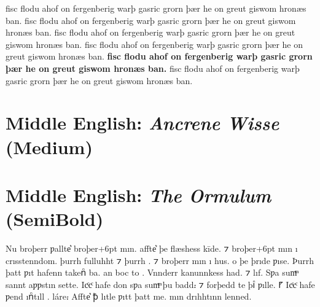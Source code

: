 \documentclass[12pt,letterpaper,openany]{book}
\begin{document}
{\extralight{} fisc flodu ahof on fergenberig warþ gasric grorn þær he on greut giswom hronæs ban.
\light{} fisc flodu ahof on fergenberig warþ gasric grorn þær he on greut giswom hronæs ban.
\medium{} fisc flodu ahof on fergenberig warþ gasric grorn þær he on greut giswom hronæs ban.
\semibold{} fisc flodu ahof on fergenberig warþ gasric grorn þær he on greut giswom hronæs ban.
\textbf{fisc flodu ahof on fergenberig warþ gasric grorn þær he on greut giswom hronæs ban.}
\extrabold{} fisc flodu ahof on fergenberig warþ gasric grorn þær he on greut giswom hronæs ban.}

\section{Middle English: \textit{Ancrene Wisse} (Medium)}

{\large\medium{}}

\section{Middle English: \textit{The Ormulum} (SemiBold)}

{\large\semibold{}
Nu broþerr ƿallte͛ broþer\kern-6ptᫍ\kern+6pt{} mın. affte͛ þe flæshess kīde. ⁊
broþer\kern-6ptᫍ\kern+6pt{} mın ı crısstenndom.
þurrh fulluhht ⁊ þurrh . ⁊ broþerr mın ı  hus.
 o þe þrıde ƿıse.
Þurrh þatt ƿıt hafenn takenᷠ ba. an  boc to .
Vnnderr kanunnkess had.
⁊ lıf. Sƿa sumͫ sannt aƿƿstın sette. Icͨcͨ hafe don sƿa sumͫ þu badd⹎ ⁊ forþedd te
þıᷠ ƿılle. ⹍ Icͨcͨ hafe ƿend ınᷠtıll . 
 láre⹎ Affte͛ ꝥ lıtᫎle
ƿıtt þatt me. mın drıhhtınn  lenned.}
\end{document}
